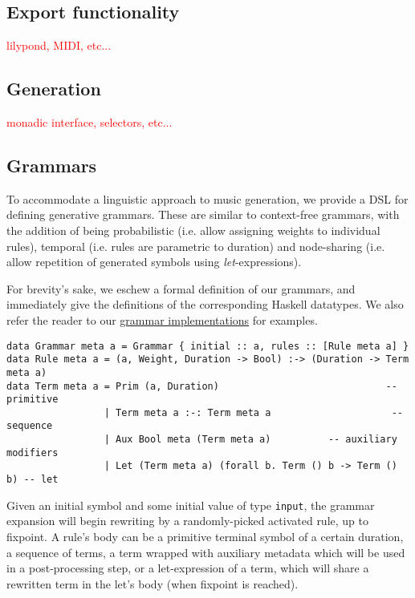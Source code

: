 \documentclass[11pt,a4paper]{article}
\newcommand{\icode}[1]{\texttt{#1}}
\newcommand\todo[1]{\textcolor{red}{#1}}
\begin{document}
\subsection{Export functionality}
\todo{lilypond, MIDI, etc...}

\subsection{Generation}
\todo{monadic interface, selectors, etc...}

\subsection{Grammars}
To accommodate a linguistic approach to music generation, we provide a DSL for defining generative grammars. These are similar to context-free grammars, with the addition of being probabilistic (i.e. allow assigning weights to individual rules), temporal (i.e. rules are parametric to duration) and node-sharing (i.e. allow repetition of generated symbols using \textit{let}-expressions).

For brevity's sake, we eschew a formal definition of our grammars, and immediately give the definitions of the corresponding Haskell datatypes. We also refer the reader to our \href{https://github.com/omelkonian/AlgoRhythm/blob/master/AlgoRhythm/src/Grammar}{grammar implementations} for examples.
\begin{verbatim}
data Grammar meta a = Grammar { initial :: a, rules :: [Rule meta a] }
data Rule meta a = (a, Weight, Duration -> Bool) :-> (Duration -> Term meta a)
data Term meta a = Prim (a, Duration)                             -- primitive
                 | Term meta a :-: Term meta a                     -- sequence
                 | Aux Bool meta (Term meta a)          -- auxiliary modifiers
                 | Let (Term meta a) (forall b. Term () b -> Term () b) -- let
\end{verbatim}

Given an initial symbol and some initial value of type \icode{input}, the grammar expansion will begin rewriting by a randomly-picked activated rule, up to fixpoint. A rule's body can be a primitive terminal symbol of a certain duration, a sequence of terms, a term wrapped with auxiliary metadata which will be used in a post-processing step, or a let-expression of a term, which will share a rewritten term in the let's body (when fixpoint is reached).
\end{document}
